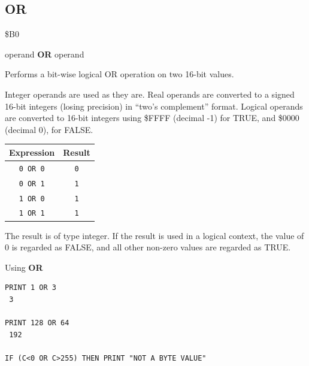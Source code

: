 \subsection{OR}
\begin{description}[leftmargin=2cm,style=nextline]
\item [Token:]    \$B0

\item [Format:]   operand {\bf OR} operand

\item [Usage:]    Performs a bit-wise logical OR operation on two 16-bit values.

                  Integer operands are used as they are. Real operands are converted to a signed 16-bit integers (losing precision) in ``two's complement'' format. Logical operands are converted to 16-bit integers using \$FFFF (decimal -1) for TRUE, and \$0000 (decimal 0), for FALSE.

                  \begin{center}
                  \setlength{\tabcolsep}{1mm}
                     \begin{tabular}{|c|c|}
                        \hline
                        {\bf Expression} & {\bf Result}  \\
                        \hline
                           \texttt{0 OR 0}  &  \texttt{0} \\
                           \texttt{0 OR 1}  &  \texttt{1} \\
                           \texttt{1 OR 0}  &  \texttt{1} \\
                           \texttt{1 OR 1}  &  \texttt{1} \\
                        \hline
                     \end{tabular}
                  \end{center}

\item [Remarks:]  The result is of type integer. If the result is used in a logical context, the value of 0 is regarded as FALSE, and all other non-zero values are regarded as TRUE.

\item [Examples:] Using {\bf OR}

\begin{tcolorbox}[colback=black,coltext=white]
\verbatimfont{\codefont}
\begin{verbatim}
PRINT 1 OR 3
 3

PRINT 128 OR 64
 192

IF (C<0 OR C>255) THEN PRINT "NOT A BYTE VALUE"
\end{verbatim}
\end{tcolorbox}
\end{description}

